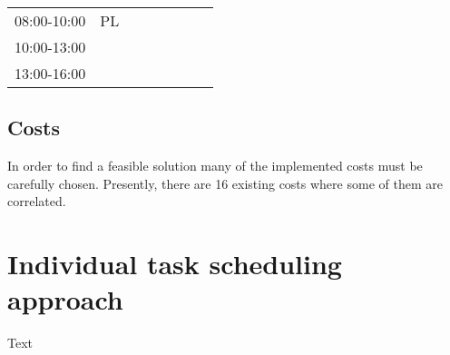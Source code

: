 \begin{table}[]
\begin{tabular}{llllllll}
\multicolumn{1}{l|}{08:00-10:00} & \multicolumn{1}{l|}{\cellcolor[HTML]{FCFF2F}PL} &                         &                                                &                         &                                                &                         &                         \\ \cline{2-2}
\multicolumn{1}{l|}{10:00-13:00} & \multicolumn{1}{l|}{\cellcolor[HTML]{FCFF2F}}   &                         &                                                &                         &                                                &                         &                         \\ \cline{2-2}
\multicolumn{1}{l|}{13:00-16:00} & \multicolumn{1}{l|}{\cellcolor[HTML]{FCFF2F}}   &                         &                                                &                         &                                                &                         &                         \\ \cline{2-2}
\end{tabular}
\end{table}



    


\subsection{Costs}
In order to find a feasible solution many of the implemented costs must be carefully chosen. Presently, there are 16 existing costs where some of them are correlated. 

\section{Individual task scheduling approach}\label{Individual}
Text

